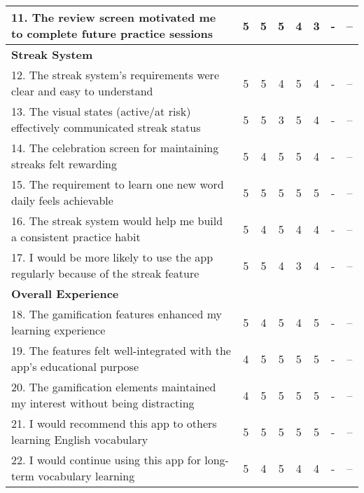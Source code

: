 \begin{table}[ht]
{\begin{tabular}{|p{}|c|c|c|c|c|c|c|}
            \hline
            11. The review screen motivated me to complete future practice sessions & 5 & 5 & 5 & 4 & 3 & - & -- \\
            \hline
            \multicolumn{8}{|l|}{\textbf{Streak System}} \\
            \hline
            12. The streak system's requirements were clear and easy to understand & 5 & 5 & 4 & 5 & 4 & - & -- \\
            \hline
            13. The visual states (active/at risk) effectively communicated streak status & 5 & 5 & 3 & 5 & 4 & - & -- \\
            \hline
            14. The celebration screen for maintaining streaks felt rewarding & 5 & 4 & 5 & 5 & 4 & - & -- \\
            \hline
            15. The requirement to learn one new word daily feels achievable & 5 & 5 & 5 & 5 & 5 & - & -- \\
            \hline
            16. The streak system would help me build a consistent practice habit & 5 & 4 & 5 & 4 & 4 & - & -- \\
            \hline
            17. I would be more likely to use the app regularly because of the streak feature & 5 & 5 & 4 & 3 & 4 & - & -- \\
            \hline
            \multicolumn{8}{|l|}{\textbf{Overall Experience}} \\
            \hline
            18. The gamification features enhanced my learning experience & 5 & 4 & 5 & 4 & 5 & - & -- \\
            \hline
            19. The features felt well-integrated with the app's educational purpose & 4 & 5 & 5 & 5 & 5 & - & -- \\
            \hline
            20. The gamification elements maintained my interest without being distracting & 4 & 5 & 5 & 5 & 5 & - & -- \\
            \hline
            21. I would recommend this app to others learning English vocabulary & 5 & 5 & 5 & 5 & 5 & - & -- \\
            \hline
            22. I would continue using this app for long-term vocabulary learning & 5 & 4 & 5 & 4 & 4 & - & -- \\
            \hline
        \end{tabular}
    }
\end{table}
